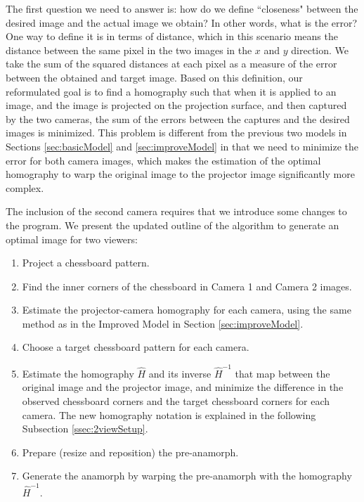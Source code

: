 \documentclass[11pt, oneside, reqno]{book}
\begin{document}
The first question we need to answer is: how do we define ``closeness" between the desired image and the actual image we obtain? In other words, what is the error? One way to define it is in terms of distance, which in this scenario means the distance between the same pixel in the two images in the $x$ and $y$ direction. 
We take the sum of the squared distances at each pixel as a measure of the error between the obtained and target image. Based on this definition, our reformulated goal is to find a homography such that when it is applied to an image, and the image is projected on the projection surface, and then captured by the two cameras, the sum of the errors between the captures and the desired images is minimized. This problem is different from the previous two models in Sections \ref{sec:basicModel} and \ref{sec:improveModel} in that we need to minimize the error for both camera images, which makes the estimation of the optimal homography to warp the original image to the projector image significantly more complex.

The inclusion of the second camera requires that we introduce some changes to the program. We present the updated outline of the algorithm to generate an optimal image for two viewers:
\begin{enumerate}
	\item Project a chessboard pattern.
	\item Find the inner corners of the chessboard in Camera 1 and Camera 2 images.
	\item Estimate the projector-camera homography for each camera, using the same method as in the Improved Model in Section \ref{sec:improveModel}.
	\item Choose a target chessboard pattern for each camera.
	\item Estimate the homography $\widehat{H}$ and its inverse $\widehat{H}^{-1}$ that map between the original image and the projector image, and minimize the difference in the observed chessboard corners and the target chessboard corners for each camera. The new homography notation is explained in the following Subsection \ref{ssec:2viewSetup}.
	\item Prepare (resize and reposition) the pre-anamorph.
	\item Generate the anamorph by warping the pre-anamorph with the homography $\widehat{H}^{-1}$.
\end{enumerate}
\end{document}

